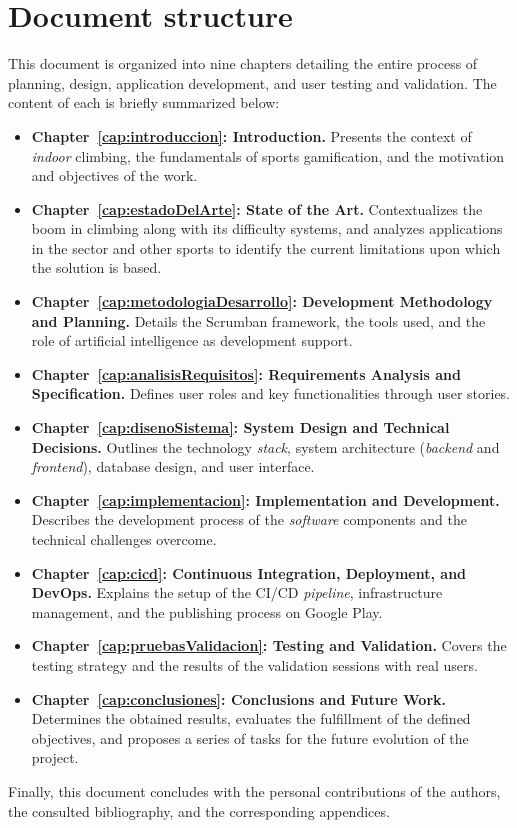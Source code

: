 \section{Document structure}

This document is organized into nine chapters detailing the entire process of planning, design, application development, and user testing and validation. The content of each is briefly summarized below:

\begin{itemize}
    \item \textbf{Chapter~\ref{cap:introduccion}: Introduction.} Presents the context of \textit{indoor} climbing, the fundamentals of sports gamification, and the motivation and objectives of the work.
    \item \textbf{Chapter~\ref{cap:estadoDelArte}: State of the Art.} Contextualizes the boom in climbing along with its difficulty systems, and analyzes applications in the sector and other sports to identify the current limitations upon which the solution is based.
    \item \textbf{Chapter~\ref{cap:metodologiaDesarrollo}: Development Methodology and Planning.} Details the Scrumban framework, the tools used, and the role of artificial intelligence as development support.
    \item \textbf{Chapter~\ref{cap:analisisRequisitos}: Requirements Analysis and Specification.} Defines user roles and key functionalities through user stories.
    \item \textbf{Chapter~\ref{cap:disenoSistema}: System Design and Technical Decisions.} Outlines the technology \textit{stack}, system architecture (\textit{backend} and \textit{frontend}), database design, and user interface.
    \item \textbf{Chapter~\ref{cap:implementacion}: Implementation and Development.} Describes the development process of the \textit{software} components and the technical challenges overcome.
    \item \textbf{Chapter~\ref{cap:cicd}: Continuous Integration, Deployment, and DevOps.} Explains the setup of the CI/CD \textit{pipeline}, infrastructure management, and the publishing process on Google Play.
    \item \textbf{Chapter~\ref{cap:pruebasValidacion}: Testing and Validation.} Covers the testing strategy and the results of the validation sessions with real users.
    \item \textbf{Chapter~\ref{cap:conclusiones}: Conclusions and Future Work.} Determines the obtained results, evaluates the fulfillment of the defined objectives, and proposes a series of tasks for the future evolution of the project.
\end{itemize}

Finally, this document concludes with the personal contributions of the authors, the consulted bibliography, and the corresponding appendices.